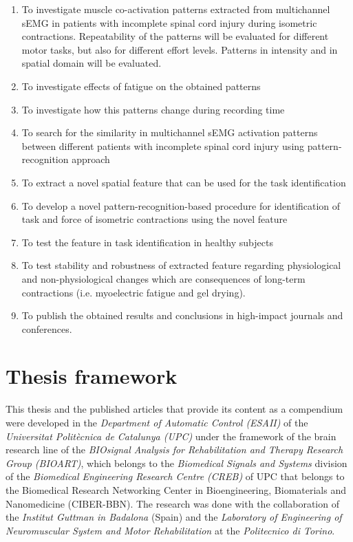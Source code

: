 \begin{enumerate}[I]

\item To investigate muscle co-activation patterns extracted from multichannel sEMG in patients with incomplete spinal cord injury during isometric contractions. Repeatability of the patterns will be evaluated for different motor tasks, but also for different effort levels. Patterns in intensity and in spatial domain will be evaluated.

\item To investigate effects of fatigue on the obtained patterns

\item To investigate how this patterns change during recording time

\item To search for the similarity in multichannel sEMG activation patterns between different patients with incomplete spinal cord injury using pattern-recognition approach

\item To extract a novel spatial feature that can be used for the task identification

\item To develop a novel pattern-recognition-based procedure for identification of task and force of isometric contractions using the novel feature

\item To test the feature in task identification in healthy subjects

\item To test stability and robustness of extracted feature regarding physiological and non-physiological changes which are consequences of long-term contractions (i.e. myoelectric fatigue and gel drying).

\item To publish the obtained results and conclusions in high-impact journals and conferences.

\end{enumerate}

     \section{Thesis framework}
     
This thesis and the published articles that provide its content as a compendium were developed in the \emph{Department of Automatic Control (ESAII)} of the \emph{Universitat Polit\`{e}cnica de Catalunya (UPC)} under the framework of the brain research line of the \emph{BIOsignal Analysis for Rehabilitation and Therapy Research Group (BIOART)}, which belongs to the \emph{Biomedical Signals and Systems} division of the \emph{Biomedical Engineering Research Centre (CREB)} of UPC that belongs to the Biomedical Research Networking Center in Bioengineering, Biomaterials and Nanomedicine (CIBER-BBN). The research was done with the collaboration of the \emph{Institut Guttman in Badalona} (Spain) and the \emph{Laboratory of Engineering of Neuromuscular System and Motor Rehabilitation} at the \emph{Politecnico di Torino}.

